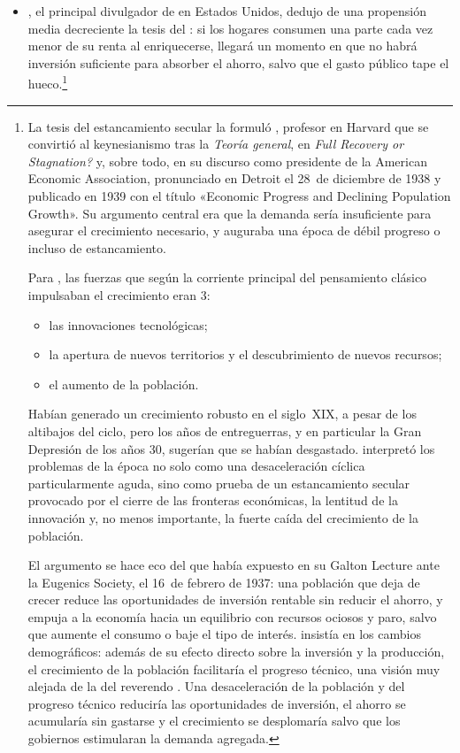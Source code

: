\documentclass[11pt]{article}
\begin{document}
\begin{itemize}
\item {}, el principal divulgador de  en Estados Unidos, dedujo de una propensión media decreciente la tesis del : si los hogares consumen una parte cada vez menor de su renta al enriquecerse, llegará un momento en que no habrá inversión suficiente para absorber el ahorro, salvo que el gasto público tape el hueco.\footnote{La tesis del estancamiento secular la formuló , profesor en Harvard que se convirtió al keynesianismo tras la \emph{Teoría general}, en \emph{Full Recovery or Stagnation?}\nocite{Hansen1938Full} y, sobre todo, en su discurso como presidente de la American Economic Association, pronunciado en Detroit el 28~de diciembre de 1938 y publicado en 1939 con el título «Economic Progress and Declining Population Growth»\nocite{Hansen1939Economic}. Su argumento central era que la demanda sería insuficiente para asegurar el crecimiento necesario, y auguraba una época de débil progreso o incluso de estancamiento.

Para , las fuerzas que según la corriente principal del pensamiento clásico impulsaban el crecimiento eran 3:
\begin{itemize}
\item las innovaciones tecnológicas;
\item la apertura de nuevos territorios y el descubrimiento de nuevos recursos;
\item el aumento de la población.
\end{itemize}
Habían generado un crecimiento robusto en el siglo~XIX, a pesar de los altibajos del ciclo, pero los años de entreguerras, y en particular la Gran Depresión de los años 30, sugerían que se habían desgastado.  interpretó los problemas de la época no solo como una desaceleración cíclica particularmente aguda, sino como prueba de un estancamiento secular provocado por el cierre de las fronteras económicas, la lentitud de la innovación y, no menos importante, la fuerte caída del crecimiento de la población.

El argumento se hace eco del que  había expuesto en su Galton Lecture ante la Eugenics Society, el 16~de febrero de 1937\nocite{Keynes1937Declining}: una población que deja de crecer reduce las oportunidades de inversión rentable sin reducir el ahorro, y empuja a la economía hacia un equilibrio con recursos ociosos y paro, salvo que aumente el consumo o baje el tipo de interés.  insistía en los cambios demográficos: además de su efecto directo sobre la inversión y la producción, el crecimiento de la población facilitaría el progreso técnico, una visión muy alejada de la del reverendo . Una desaceleración de la población y del progreso técnico reduciría las oportunidades de inversión, el ahorro se acumularía sin gastarse y el crecimiento se desplomaría salvo que los gobiernos estimularan la demanda agregada.

}
\end{itemize}
\end{document}
